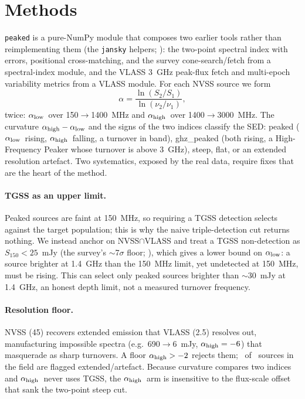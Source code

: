 \documentclass[twocolumn]{aastex631}
\newcommand{\code}[1]{\texttt{#1}}
\newcommand{\alo}{\ensuremath{\alpha_{\rm low}}}
\newcommand{\ahi}{\ensuremath{\alpha_{\rm high}}}
\begin{document}
\section{Methods}
\code{peaked} is a pure-NumPy module that composes two earlier tools rather than reimplementing them
(the \code{jansky} helpers; \citealt{jansky}): the two-point spectral index with errors, positional
cross-matching, and the survey cone-search/fetch from a spectral-index module, and the VLASS 3~GHz
peak-flux fetch and multi-epoch variability metrics from a VLASS module. For each NVSS source we form
\begin{equation}
\alpha = \frac{\ln(S_2/S_1)}{\ln(\nu_2/\nu_1)},
\end{equation}
twice: \alo\ over 150$\to$1400~MHz and \ahi\ over 1400$\to$3000~MHz. The curvature $\ahi-\alo$ and the
signs of the two indices classify the SED: peaked (\alo\ rising, \ahi\ falling, a turnover
in band), ghz\_peaked (both rising, a High-Frequency Peaker whose turnover is above 3~GHz),
steep, flat, or an extended resolution artefact. Two systematics, exposed by the
real data, require fixes that are the heart of the method.

\paragraph{TGSS as an upper limit.} Peaked sources are faint at 150~MHz, so requiring a TGSS detection
selects against the target population; this is why the naive triple-detection cut returns
nothing. We instead anchor on NVSS$\cap$VLASS and treat a TGSS non-detection as $S_{150}<25$~mJy (the
survey's $\sim$7$\sigma$ floor; \citealt{intema2017}), which gives a lower bound on \alo: a
source brighter at 1.4~GHz than the 150~MHz limit, yet undetected at 150~MHz, must be rising.
This can select only peaked sources brighter than $\sim$30~mJy at 1.4~GHz, an honest depth limit, not
a measured turnover frequency.

\paragraph{Resolution floor.} NVSS (45\arcsec) recovers extended emission that VLASS (2.5\arcsec)
resolves out, manufacturing impossible spectra (e.g.\ 690$\to$6~mJy, $\ahi=-6$) that masquerade as
sharp turnovers. A floor $\ahi>-2$ rejects them; \pkRealNextended\ of \pkRealNnvssvlass\ sources in the field
are flagged extended/artefact. Because curvature compares two indices and \ahi\ never uses TGSS,
the \ahi\ arm is insensitive to the flux-scale offset that sank the two-point steep cut.
\end{document}
